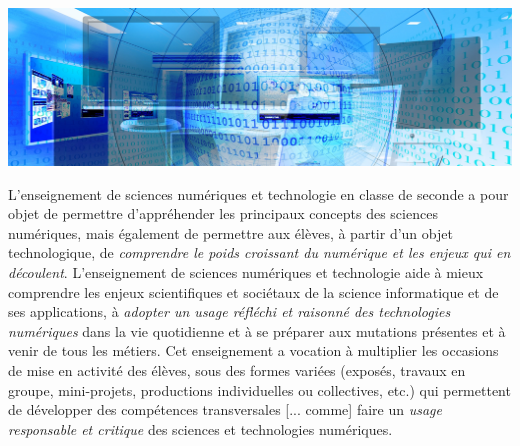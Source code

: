 \begin{jazzgraphic*}
\includegraphics[width=\linewidth]{./Images/Chapter09/banner-pixabay-909710.jpg}
\end{jazzgraphic*}


\begin{tcolorbox}[title={Introduction}, toprule=0pt, leftrule=0pt, rightrule=0pt, arc=0pt,
                  fonttitle=\scshape\boxtitlefont,
                  colbacktitle=white, coltitle=firstcolor, colframe=firstcolor, colback=firstcolor!10,
                  breakable, enhanced jigsaw]
L’enseignement de sciences numériques et technologie en classe de seconde a pour objet de permettre d’appréhender les principaux concepts des sciences numériques, mais également de permettre aux élèves, à partir d’un objet technologique, de \emph{comprendre le poids croissant du numérique et les enjeux qui en découlent}.
L’enseignement de sciences numériques et technologie aide à mieux comprendre les enjeux scientifiques et sociétaux de la science informatique et de ses applications, à \emph{adopter un usage réfléchi et raisonné des technologies numériques} dans la vie quotidienne et à se préparer aux mutations présentes et à venir de tous les métiers.
Cet enseignement a vocation à multiplier les occasions de mise en activité des élèves, sous des formes variées (exposés, travaux en groupe, mini-projets, productions individuelles ou collectives, etc.) qui permettent de développer des compétences transversales [... comme] faire un \emph{usage responsable et critique} des sciences et technologies numériques.
\end{tcolorbox}

